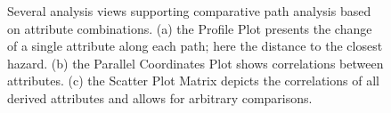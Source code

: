\documentclass[review,journal]{vgtc}         %
\begin{document}
\begin{figure}
	\centering
	\hfill
	\hfill
	\caption{Several analysis views supporting comparative path analysis based on attribute combinations. (a) the Profile Plot presents the change of a single attribute along each path; here the distance to the closest hazard. (b) the Parallel Coordinates Plot shows correlations between attributes. (c) the Scatter Plot Matrix depicts the correlations of all derived attributes and allows for arbitrary comparisons.}
\end{figure}
\end{document}
